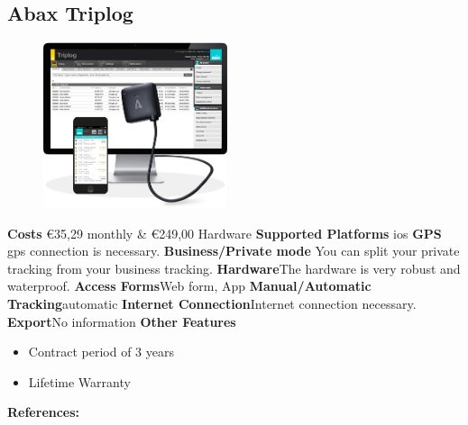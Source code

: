 \begin{singlespace}
\section{Abax Triplog}
\begin{figure}
  \begin{center}
    \includegraphics[width=0.48\textwidth]{bilder/abax}
  \end{center}
\end{figure}
\textbf{Costs} \euro 35,29 monthly \& \euro 249,00 Hardware
\newline\newline
\textbf{Supported Platforms} \gls{ios}
\newline\newline
\textbf{GPS} \gls{gps} connection is necessary.
\newline\newline
\textbf{Business/Private mode} You can split your private tracking from your business tracking.
\newline\newline
\textbf{Hardware}The hardware is very robust and waterproof.
\newline\newline
\textbf{Access Forms}Web form, App
\newline\newline
\textbf{Manual/Automatic Tracking}automatic
\newline\newline
\textbf{Internet Connection}Internet connection necessary.
\newline\newline
\textbf{Export}No information
\newline\newline
\textbf{Other Features} 
\begin{itemize}
\item Contract period of 3 years
\item Lifetime Warranty
\end{itemize}
\textbf{References:} \cite{Abax_Triplog}
\newpage
\clearpageauthor

\end{singlespace}
